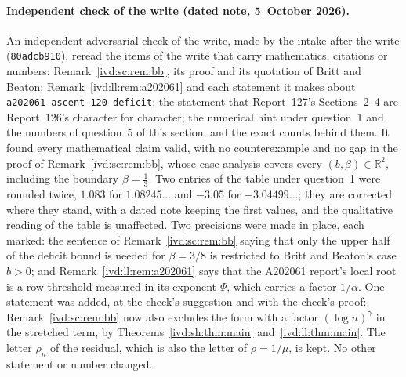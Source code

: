 \documentclass[11pt,letterpaper]{article}
\theoremstyle{remark}\newtheorem{remark}[theorem]{Remark}
\numberwithin{equation}{section}
\newcommand{\file}[1]{\nolinkurl{#1}}
\begin{document}
\paragraph{Independent check of the write (dated note, 5~October 2026).}
An independent adversarial check of the write, made by the intake after the write (\texttt{80adcb910}), reread the items of the write that carry mathematics, citations or numbers: Remark~\ref{ivd:sc:rem:bb}, its proof and its quotation of Britt and Beaton; Remark~\ref{ivd:ll:rem:a202061} and each statement it makes about \file{a202061-ascent-120-deficit}; the statement that Report~127's Sections~2--4 are Report~126's character for character; the numerical hint under question~1 and the numbers of question~5 of this section; and the exact counts behind them. It found every mathematical claim valid, with no counterexample and no gap in the proof of Remark~\ref{ivd:sc:rem:bb}, whose case analysis covers every $(b,\beta)\in\mathbb R^2$, including the boundary $\beta=\frac13$. Two entries of the table under question~1 were rounded twice, $1.083$ for $1.08245\ldots$ and $-3.05$ for $-3.04499\ldots$; they are corrected where they stand, with a dated note keeping the first values, and the qualitative reading of the table is unaffected. Two precisions were made in place, each marked: the sentence of Remark~\ref{ivd:sc:rem:bb} saying that only the upper half of the deficit bound is needed for $\beta=3/8$ is restricted to Britt and Beaton's case $b>0$; and Remark~\ref{ivd:ll:rem:a202061} says that the A202061 report's local root is a row threshold measured in its exponent $\Psi$, which carries a factor $1/\alpha$. One statement was added, at the check's suggestion and with the check's proof: Remark~\ref{ivd:sc:rem:bb} now also excludes the form with a factor $(\log n)^\gamma$ in the stretched term, by Theorems~\ref{ivd:sh:thm:main} and~\ref{ivd:ll:thm:main}. The letter $\rho_n$ of the residual, which is also the letter of $\rho=1/\mu$, is kept. No other statement or number changed.
\end{document}
